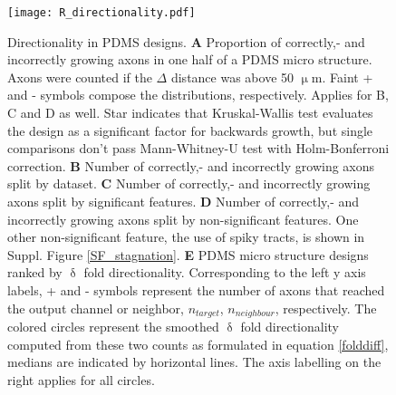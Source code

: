 \begin{figure}[h!]
    \texttt{[image: R\_directionality.pdf]}
    \caption[Directionality in PDMS designs]
        {Directionality in PDMS designs. \textbf{A} Proportion of correctly,-
        and incorrectly growing axons in one half of a PDMS micro structure.
        Axons were counted if the $\Delta$ distance was above 50 $\upmu$m. Faint
        + and - symbols compose the distributions, respectively. Applies for B,
        C and D as well. Star indicates that Kruskal-Wallis test evaluates the
        design as a significant factor for backwards growth, but single
        comparisons don't pass Mann-Whitney-U test with Holm-Bonferroni
        correction. \textbf{B} Number of correctly,- and incorrectly growing
        axons split by dataset. \textbf{C} Number of correctly,- and incorrectly
        growing axons split by significant features. \textbf{D} Number of
        correctly,- and incorrectly growing axons split by non-significant
        features. One other non-significant feature, the use of spiky tracts, is
        shown in Suppl. Figure \ref{SF_stagnation}. \textbf{E} PDMS micro
        structure designs ranked by $\updelta$ fold directionality.
        Corresponding to the left y axis labels, + and - symbols represent the
        number of axons that reached the output channel or neighbor,
        $n_{target}$, $n_{neighbour}$, respectively. The colored circles
        represent the smoothed $\updelta$ fold directionality computed from
        these two counts as formulated in equation \ref{folddiff}, medians are
        indicated by horizontal lines. The axis labelling on the right applies
        for all circles. } 
    \label{R_directionality}
\end{figure}

